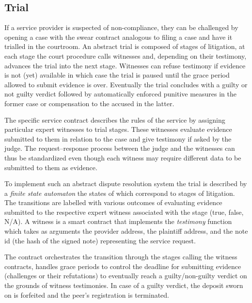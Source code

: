 \subsection{Trial}
\label{sec:swindle}

If a service provider is suspected of non-compliance, they can be challenged
by opening a case with the swear contract analogous to filing a case and have it 
trialled in the courtroom.
An abstract trial is composed of stages of litigation, at each stage
the court procedure calls witnesses and, depending on their testimony,
advances the trial into the next stage. Witnesses can refuse testimony
if evidence is not (yet) available in which case the trial
is paused until the grace period allowed to submit evidence is over.
Eventually the trial concludes with a guilty or not guilty verdict followed
by automatically enforced punitive measures in the former case or
compensation to the accused in the latter.

The specific service contract describes the rules of the service
by assigning particular expert witnesses to trial stages. These witnesses
evaluate evidence submitted to them in relation to the case
and give testimony if asked by the judge.
The request--response process between the judge and the witnesses can
thus be standardized
even though each witness may require different data to be submitted to them as evidence.

To implement such an abstract dispute resolution system
the trial is described by a \emph{finite state automaton} the states of which correspond to stages of litigation. 
The transitions are labelled with various outcomes of evaluating evidence submitted
to the respective expert witness associated with the stage (true, false, N/A). A witness
is a smart contract that implements the \emph{testimony} function which takes
as arguments the provider address, the plaintiff address, and the note id (the hash of the signed note)
representing the service request.

The  contract orchestrates the transition through the stages calling the witness contracts,
handles grace periods to control the deadline for submitting evidence (challenges or their refutations) to
eventually reach a guilty/non-guilty verdict on the grounds of witness testimonies.
In case of a guilty verdict, the deposit sworn on is forfeited and the peer's registration is
terminated. 

